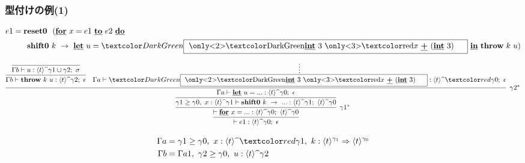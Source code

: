 \newcommand\boxterm{\framebox{
    \only<2>{\green{$\cint{3}$}}
    \only<3>{\red{$x~\cPlus~(\cint{3})$}}
    \phantom{A}
  }}

\begin{frame}
  \frametitle{型付けの例(1)}
  \begin{align*}
    e1 & = \Resetz ~~(\cfordo{x = e1}{e2} \\
       & \phantom{=}~~~ \Shiftz~k~\to~
         {\cLet~u=\green{\boxterm}~\cIn}~\Throw~k~u)
  \end{align*}

  \[
    \infer{\vdash e1 : \codeTs{t}{\gamma0};~\epsilon}
    {\infer[\gamma1^*]{\vdash \cfor{x=...} :
        \codeTs{t}{\gamma0};~\codeTs{t}{\gamma0}}
      {\infer{\gamma1 \ord \gamma0,~x:\codeTs{t}{\gamma1}
          \vdash \Shiftz~k~\to~... :
          \codeTs{t}{\gamma1};~\codeTs{t}{\gamma0}}
        {\infer[\gamma2^*]{\Gamma a \vdash \cLet~u=...:\codeTs{t}{\gamma0};~\epsilon}
          {\infer{\Gamma b \vdash
              \Throw~k~u:\codeTs{t}{\gamma2};~\epsilon }
            {\infer{\Gamma b \vdash
                u:\codeTs{t}{\gamma1 \cup \gamma2};~ \sigma}
              {}
            }
            &\infer*{\Gamma a \vdash
              \green{\boxterm}:\codeTs{t}{\red{\gamma0}};~\epsilon}
            {}
          }
        }
      }
    }
  \]


  {\footnotesize
    \begin{align*}
      \Gamma a &= \gamma1 \ord \gamma0,~x:\codeTs{t}{\red{\gamma1}},
                ~k: \contT{\codeT{t}{\gamma_1}}{\codeT{t}{\gamma_0}} \\
      \Gamma b &= \Gamma a1,~\gamma2 \ord \gamma0,~u:\codeTs{t}{\gamma2}
    \end{align*}
  }


\end{frame}



